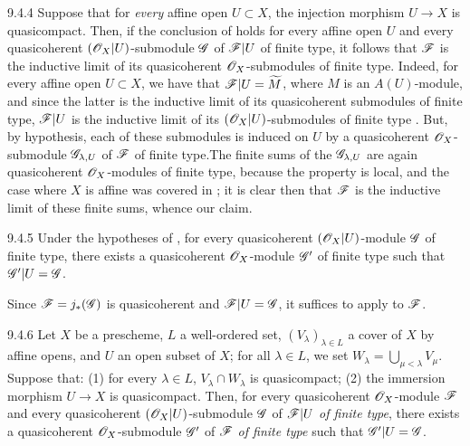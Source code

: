 \documentclass[10pt,oneside]{book}
\begin{document}
\begin{env}[Remark]{9.4.4}
\label{rmk-1.9.4.4}
Suppose that for \emph{every} affine open $U\subset X$, the injection morphism $U\to X$ is
quasicompact. Then, if the conclusion of  holds for every affine open $U$
and every quasicoherent $(\mathscr{O}_X|U)$-submodule $\mathscr{G}$ of $\mathscr{F}|U$ of finite type, it
follows
that $\mathscr{F}$ is the inductive limit of its quasicoherent $\mathscr{O}_X$-submodules of finite type.
Indeed, for every affine open $U\subset X$, we have that $\mathscr{F}|U=\widetilde{M}$, where $M$
is an $A(U)$-module, and since the latter is the inductive limit of its quasicoherent
submodules of finite type, $\mathscr{F}|U$ is the inductive limit of its $(\mathscr{O}_X|U)$-submodules of
finite type . But, by hypothesis, each of
these submodules is induced on $U$ by a quasicoherent $\mathscr{O}_X$-submodule
$\mathscr{G}_{\lambda,U}$ of $\mathscr{F}$ of finite type.The finite sums of the
$\mathscr{G}_{\lambda,U}$ are again quasicoherent $\mathscr{O}_X$-modules of finite type,
because the property is local, and the case where $X$ is affine was covered in
; it is clear then that $\mathscr{F}$ is the inductive limit of these
finite sums, whence our claim.
\end{env}
 
\begin{envs}[Corollary]{9.4.5}
\label{cor-1.9.4.5}
Under the hypotheses of , for every quasicoherent $(\mathscr{O}_X|U)$-module
$\mathscr{G}$ of finite type, there exists a quasicoherent $\mathscr{O}_X$-module
$\mathscr{G}'$ of finite type such that $\mathscr{G}'|U=\mathscr{G}$.
\end{envs}

Since $\mathscr{F}=j_*(\mathscr{G})$ is quasicoherent  and
$\mathscr{F}|U=\mathscr{G}$, it suffices to apply  to $\mathscr{F}$.

\begin{envs}[Lemma]{9.4.6}
\label{lem-1.9.4.6}
Let $X$ be a prescheme, $L$ a well-ordered set, $(V_\lambda)_{\lambda\in L}$ a cover of $X$
by affine opens, and $U$ an open subset of $X$; for all $\lambda\in L$, we set
$W_\lambda=\bigcup_{\mu<\lambda}V_\mu$. Suppose that: (1) for every $\lambda\in L$,
$V_\lambda\cap W_\lambda$ is quasicompact; (2) the immersion morphism $U\to X$ is
quasicompact. Then, for every quasicoherent $\mathscr{O}_X$-module $\mathscr{F}$ and every quasicoherent
$(\mathscr{O}_X|U)$-submodule $\mathscr{G}$ of $\mathscr{F}|U$ \emph{of finite type}, there exists a
quasicoherent $\mathscr{O}_X$-submodule $\mathscr{G}'$ of $\mathscr{F}$ \emph{of finite type} such that
$\mathscr{G}'|U=\mathscr{G}$.
\end{envs}
\end{document}
